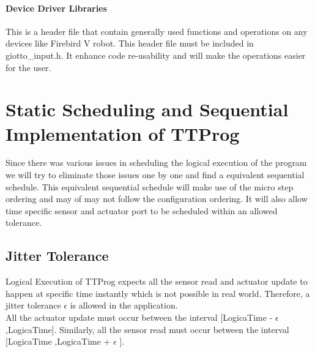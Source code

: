 \documentclass[16pt]{report}
\begin{document}
\subsubsection{Device Driver Libraries}
This is a header file that contain generally used functions and operations on any devices like Firebird V robot. This header file must be included in giotto\_input.h. It enhance code re-usability and will make the operations easier for the user.



\chapter{Static Scheduling and Sequential Implementation of TTProg}

Since there was various issues in scheduling the logical execution of the program we will try to eliminate those issues one by one and find a equivalent sequential schedule. This equivalent sequential schedule will make use of the micro step ordering and may of may not follow the configuration ordering. It will also allow time specific sensor and actuator port to be scheduled within an allowed tolerance.

\section{Jitter Tolerance}
Logical Execution of TTProg expects all the sensor read and actuator update to happen at specific time instantly which is not possible in real world. Therefore, a jitter tolerance $\epsilon$ is allowed in the application. \\
All  the actuator update must occur between the interval [LogicaTime - $\epsilon$  ,LogicaTime]. 
Similarly, all the sensor read must occur between the interval [LogicaTime  ,LogicaTime + $\epsilon$ ]. 
\end{document}
